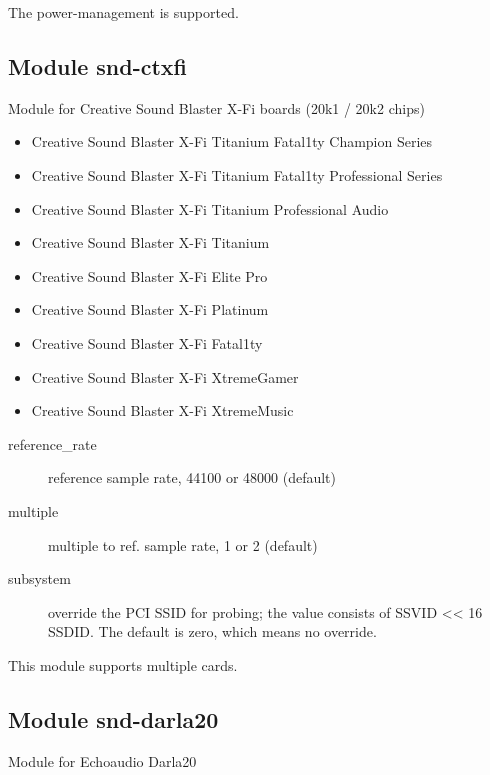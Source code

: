\documentclass[a4paper,8pt,english]{sphinxmanual}
\begin{document}
The power-management is supported.


\subsection{Module snd-ctxfi}
\label{sound/alsa-configuration:module-snd-ctxfi}
Module for Creative Sound Blaster X-Fi boards (20k1 / 20k2 chips)
\begin{itemize}
\item {} 
Creative Sound Blaster X-Fi Titanium Fatal1ty Champion Series

\item {} 
Creative Sound Blaster X-Fi Titanium Fatal1ty Professional Series

\item {} 
Creative Sound Blaster X-Fi Titanium Professional Audio

\item {} 
Creative Sound Blaster X-Fi Titanium

\item {} 
Creative Sound Blaster X-Fi Elite Pro

\item {} 
Creative Sound Blaster X-Fi Platinum

\item {} 
Creative Sound Blaster X-Fi Fatal1ty

\item {} 
Creative Sound Blaster X-Fi XtremeGamer

\item {} 
Creative Sound Blaster X-Fi XtremeMusic

\end{itemize}
\begin{description}
\item[{reference\_rate}] \leavevmode
reference sample rate, 44100 or 48000 (default)

\item[{multiple}] \leavevmode
multiple to ref. sample rate, 1 or 2 (default)

\item[{subsystem}] \leavevmode
override the PCI SSID for probing;
the value consists of SSVID \textless{}\textless{} 16 \textbar{} SSDID.
The default is zero, which means no override.

\end{description}

This module supports multiple cards.


\subsection{Module snd-darla20}
\label{sound/alsa-configuration:module-snd-darla20}
Module for Echoaudio Darla20
\end{document}
